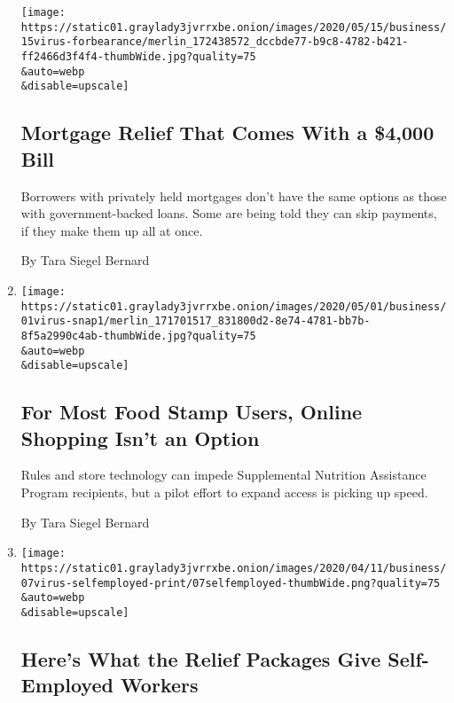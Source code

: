 \begin{enumerate}
  \texttt{[image: https://static01.graylady3jvrrxbe.onion/images/2020/05/15/business/15virus-forbearance/merlin\_172438572\_dccbde77-b9c8-4782-b421-ff2466d3f4f4-thumbWide.jpg?quality=75\\\&auto=webp\\\&disable=upscale]}

  \hypertarget{mortgage-relief-that-comes-with-a-4000-bill}{%
  \subsection{Mortgage Relief That Comes With a \$4,000
  Bill}\label{mortgage-relief-that-comes-with-a-4000-bill}}

  Borrowers with privately held mortgages don't have the same options as
  those with government-backed loans. Some are being told they can skip
  payments, if they make them up all at once.

  By Tara Siegel Bernard
\item
  \href{/2020/05/01/your-money/food-stamps-snap-coronavirus.html}{}

  \texttt{[image: https://static01.graylady3jvrrxbe.onion/images/2020/05/01/business/01virus-snap1/merlin\_171701517\_831800d2-8e74-4781-bb7b-8f5a2990c4ab-thumbWide.jpg?quality=75\\\&auto=webp\\\&disable=upscale]}

  \hypertarget{for-most-food-stamp-users-online-shopping-isnt-an-option}{%
  \subsection{For Most Food Stamp Users, Online Shopping Isn't an
  Option}\label{for-most-food-stamp-users-online-shopping-isnt-an-option}}

  Rules and store technology can impede Supplemental Nutrition
  Assistance Program recipients, but a pilot effort to expand access is
  picking up speed.

  By Tara Siegel Bernard
\item
  \href{/article/self-employed-workers-unemployment-coronavirus-stimulus-package.html}{}

  \texttt{[image: https://static01.graylady3jvrrxbe.onion/images/2020/04/11/business/07virus-selfemployed-print/07selfemployed-thumbWide.png?quality=75\\\&auto=webp\\\&disable=upscale]}

  \hypertarget{heres-what-the-relief-packages-give-self-employed-workers}{%
  \subsection{Here's What the Relief Packages Give Self-Employed
  Workers}\label{heres-what-the-relief-packages-give-self-employed-workers}}


\end{enumerate}
